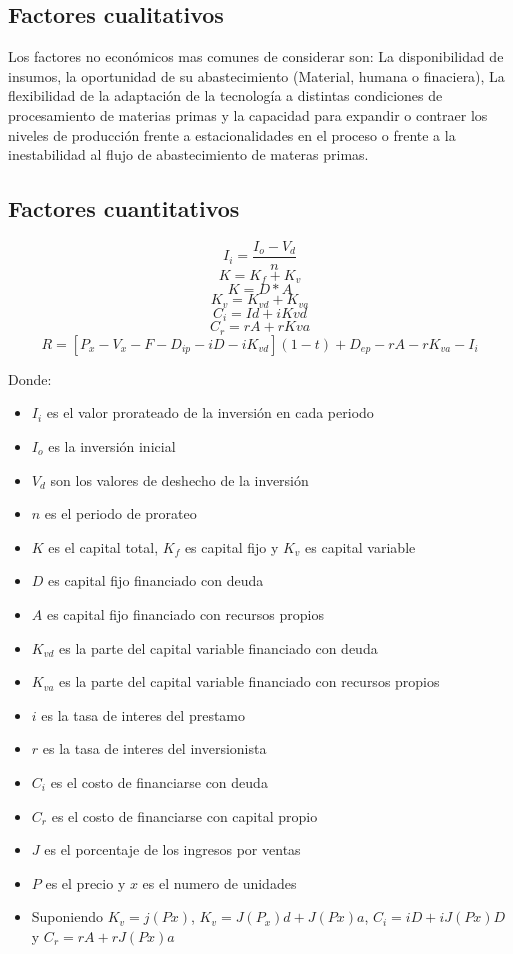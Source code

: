 \documentclass[a4paper, 11pt, oneside]{article}
\begin{document}
\subsection{Factores cualitativos}

Los factores no económicos mas comunes de considerar son: La disponibilidad de insumos, la oportunidad de su
abastecimiento (Material, humana o finaciera), La flexibilidad de la adaptación de la tecnología a distintas
condiciones de procesamiento de materias primas y la capacidad para expandir o contraer los niveles de producción
frente a estacionalidades en el proceso o frente a la inestabilidad al flujo de abastecimiento de materas primas.

\subsection{Factores cuantitativos}

	\[I_i=\frac{I_o-V_d}{n}\]
	\[K=K_f+K_v\]
	\[K=D*A\]
	\[K_v=K_{vd} + K_{va}\]
	\[C_i=Id + iK{vd}\]
	\[C_r=rA + rKva \]
	\[R=[P_x-V_x-F-D_{ip}-iD-iK_{vd}](1-t) + D_{ep} - rA - rK_{va} - I_i \]

Donde:

\begin{itemize}
	\item $I_i$ es el valor prorateado de la inversión en cada periodo
	\item $I_o$ es la inversión inicial
	\item $V_d$ son los valores de deshecho de la inversión
	\item $n$ es el periodo de prorateo
	\item $K$ es el capital total, $K_f$ es capital fijo y $K_v$ es capital variable
	\item $D$ es capital fijo financiado con deuda
	\item $A$ es capital fijo financiado con recursos propios
	\item $K_{vd}$ es la parte del capital variable financiado con deuda
	\item $K_{va}$ es la parte del capital variable financiado con recursos propios
	\item $i$ es la tasa de interes del prestamo
	\item $r$ es la tasa de interes del inversionista
	\item $C_i$ es el costo de financiarse con deuda
	\item $C_r$ es el costo de financiarse con capital propio
	\item $J$ es el porcentaje de los ingresos por ventas
	\item $P$ es el precio y $x$ es el numero de unidades
	\item Suponiendo $K_v=j(Px)$, $K_v=J(P_x)d+J(Px)a$, $C_i=iD+iJ(Px)D$ y
	$C_r=rA+rJ(Px)a$
\end{itemize}
\end{document}
